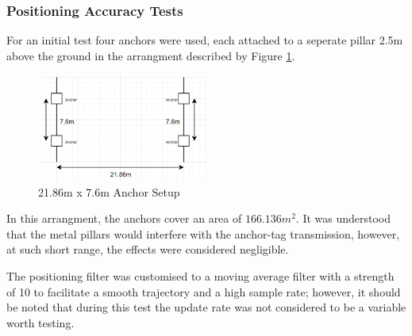 \documentclass[12pt, a4paper]{article}
\begin{document}
\subsubsection{Positioning Accuracy Tests}
For an initial test four anchors were used, each attached to a seperate pillar 2.5m above the ground in the arrangment described by Figure \ref{fig:setup1}.
\begin{figure}[H]
    \centering
    \includegraphics[width=0.5\textwidth]{setup1.png}
    \caption{21.86m x 7.6m Anchor Setup}
    \label{fig:setup1}
\end{figure}
In this arrangment, the anchors cover an area of $166.136m^2$. 
It was understood that the metal pillars would interfere with the anchor-tag transmission, however, at such short range, 
the effects were considered negligible. 

The positioning filter was customised to a moving average filter with a strength of 10 to facilitate a smooth trajectory
and a high sample rate; however, it should be noted that during this test the update rate was not considered to be a variable worth testing.
\end{document}
